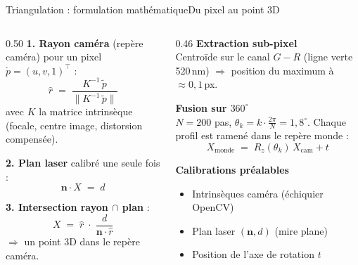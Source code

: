\documentclass[aspectratio=169,10pt]{beamer}
\begin{document}
\begin{frame}{Triangulation : formulation mathématique}{Du pixel au point 3D}
  \begin{columns}[T,onlytextwidth]
    \begin{column}{0.50\textwidth}
      \footnotesize
      \textbf{1. Rayon caméra} (repère caméra) pour un pixel $\tilde{p}=(u,v,1)^\top$ :
      \[
        \hat{r} \;=\; \frac{K^{-1}\,\tilde{p}}{\lVert K^{-1}\,\tilde{p}\rVert}
      \]
      avec $K$ la matrice intrinsèque (focale, centre image, distorsion compensée).

      \vspace{0.20cm}
      \textbf{2. Plan laser} calibré une seule fois :
      \[
        \mathbf{n}\cdot X \;=\; d
      \]

      \textbf{3. Intersection rayon $\cap$ plan} :
      \[
        X \;=\; \hat{r}\;\cdot\;\frac{d}{\mathbf{n}\cdot\hat{r}}
      \]
      $\Rightarrow$ un point 3D dans le repère caméra.
    \end{column}
    \begin{column}{0.46\textwidth}
      \footnotesize
      \textbf{Extraction sub-pixel}\\
      Centroïde sur le canal $G-R$ (ligne verte 520\,nm) $\Rightarrow$ position du maximum à $\approx 0{,}1$\,px.

      \vspace{0.18cm}
      \textbf{Fusion sur $360^\circ$}\\
      $N=200$ pas, $\theta_k = k\cdot\frac{2\pi}{N}=1{,}8^\circ$. Chaque profil est ramené dans le repère monde :
      \[
        X_{\text{monde}} \;=\; R_z(\theta_k)\,X_{\text{cam}} + t
      \]

      \vspace{0.10cm}
      \textbf{Calibrations préalables}
      \begin{itemize}
        \item Intrinsèques caméra (échiquier OpenCV)
        \item Plan laser $(\mathbf{n}, d)$ (mire plane)
        \item Position de l'axe de rotation $t$
      \end{itemize}
    \end{column}
  \end{columns}
\end{frame}
\end{document}
